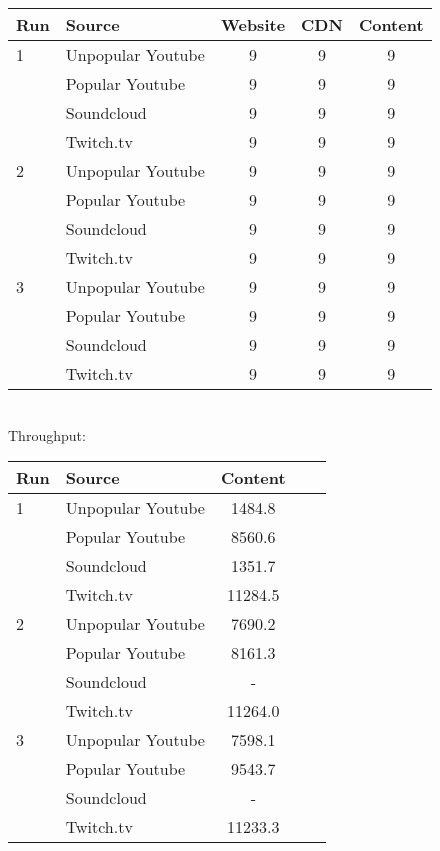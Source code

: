 \documentclass{sig-alternate-05-2015}
\begin{document}
\begin{tabular}{|l|l|c|c|c|} \hline
Run & Source & Website & CDN & Content \\ \hline
1 & Unpopular Youtube & 9 & 9 & 9 \\ \hline
  & Popular Youtube   & 9 & 9 & 9 \\ \hline
  & Soundcloud        & 9 & 9 & 9 \\ \hline
  & Twitch.tv         & 9 & 9 & 9 \\ \hline
2 & Unpopular Youtube & 9 & 9 & 9 \\ \hline
  & Popular Youtube   & 9 & 9 & 9 \\ \hline
  & Soundcloud        & 9 & 9 & 9 \\ \hline
  & Twitch.tv         & 9 & 9 & 9 \\ \hline
3 & Unpopular Youtube & 9 & 9 & 9 \\ \hline
  & Popular Youtube   & 9 & 9 & 9 \\ \hline
  & Soundcloud        & 9 & 9 & 9 \\ \hline
  & Twitch.tv         & 9 & 9 & 9 \\ \hline
\end{tabular}
\vspace{1em} \\
Throughput: \\
\begin{tabular}{|l|l|c|c|c|} \hline
Run & Source & Content \\ \hline
1 & Unpopular Youtube & 1484.8  \\ \hline
  & Popular Youtube   & 8560.6  \\ \hline
  & Soundcloud        & 1351.7  \\ \hline
  & Twitch.tv         & 11284.5 \\ \hline
2 & Unpopular Youtube & 7690.2  \\ \hline
  & Popular Youtube   & 8161.3  \\ \hline
  & Soundcloud        & -       \\ \hline
  & Twitch.tv         & 11264.0 \\ \hline
3 & Unpopular Youtube & 7598.1  \\ \hline
  & Popular Youtube   & 9543.7  \\ \hline
  & Soundcloud        & -       \\ \hline  
  & Twitch.tv         & 11233.3 \\ \hline
\end{tabular}
\end{document}
